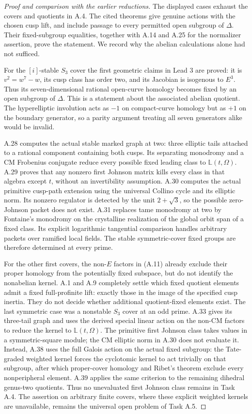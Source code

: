\begin{proof}[Proof and comparison with the earlier reductions]
The displayed cases exhaust the covers and quotients in A.4.
The cited theorems give genuine actions with the chosen cusp lift,
and include passage to every permitted open subgroup of $\Delta$.
Their fixed-subgroup equalities, together with A.14 and A.25 for
the normalizer assertion, prove the statement. We record why the
abelian calculations alone had not sufficed.

For the $[i]$-stable $S_3$ cover the first geometric claims in Lead 3
are proved: it is $v^2=w^7-w$, its cusp class has order two, and
its Jacobian is isogenous to $E^3$. Thus its seven-dimensional
rational open-curve homology becomes fixed by an open subgroup of
$\Delta$. This is a statement about the associated abelian quotient.
The hyperelliptic involution acts as $-1$ on compact-curve homology
but as $+1$ on the boundary generator, so a parity argument treating
all seven generators alike would be invalid.

A.28 computes the actual stable marked graph at two: three elliptic
tails attached to a rational component containing both cusps.
Its separating monodromy and a CM Frobenius conjugate reduce every
possible fixed leading class to $\mathbb L(t,\Omega)$. A.29 proves
that any nonzero first Johnson matrix kills every class in that
algebra except $t$, without an invertibility assumption. A.30 computes the actual primitive cusp-path extension using the
universal Collino cycle and its elliptic norm. Its nonzero regulator
is detected by the unit $2+\sqrt3$, so the possible zero-Johnson
packet does not exist. A.31 replaces tame monodromy at two by
Fontaine's monodromy on the crystalline realization of the global
orbit span of a fixed class. Its explicit logarithmic tangential
comparison handles arbitrary packets over ramified local fields.
The stable symmetric-cover fixed groups are therefore determined
at every prime.

For the other first covers, the non-$E$ factors in (A.11) already
exclude their proper homology from the potentially fixed subspace,
but do not identify the nonabelian kernel. A.1 and A.9 completely
settle which fixed quotient elements admit a fixed full-profinite
lift: exactly those in the image of the specified cusp inertia.
They do not decide whether additional quotient-fixed elements exist.
The last symmetric case was a nonstable $S_3$
cover at an odd prime. A.33 gives its three-tail graph and
uses the derived special linear action on the non-CM factors
to reduce the kernel to $\mathbb L(t,\Omega)$. The primitive
first Johnson class takes values in a symmetric-square module;
the CM elliptic norm in A.30 does not evaluate it.
Instead, A.38 uses the full Galois action on the actual fixed
subgroup: the Tate-graded weighted kernel forces the cyclotomic
kernel to act trivially on that subgroup, after which proper-cover
homology and Ribet's theorem exclude every nonperipheral element.
A.39 applies the same criterion to the remaining dihedral
genus-two quotients. Thus no unevaluated first Johnson class
remains in Task A.4. The assertion on arbitrary finite covers,
where these explicit weighted kernels are unavailable, remains
the universal open problem of Task A.5.
\end{proof}
